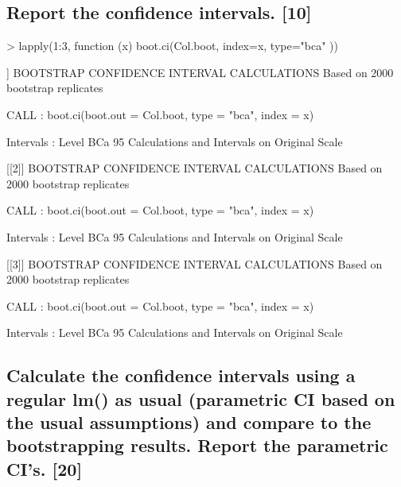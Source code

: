 \documentclass[letterpaper]{article}
\begin{document}
\subsection{Report the confidence intervals. [10]}

\begin{Schunk}
\begin{Sinput}
> lapply(1:3, function (x) {boot.ci(Col.boot, index=x, type="bca" )})
\end{Sinput}
\begin{Soutput}
[[1]]
BOOTSTRAP CONFIDENCE INTERVAL CALCULATIONS
Based on 2000 bootstrap replicates

CALL : 
boot.ci(boot.out = Col.boot, type = "bca", index = x)

Intervals : 
Level       BCa          
95%   (-0.5403, -0.1089 )  
Calculations and Intervals on Original Scale

[[2]]
BOOTSTRAP CONFIDENCE INTERVAL CALCULATIONS
Based on 2000 bootstrap replicates

CALL : 
boot.ci(boot.out = Col.boot, type = "bca", index = x)

Intervals : 
Level       BCa          
95%   (-2.7107,  1.8781 )  
Calculations and Intervals on Original Scale

[[3]]
BOOTSTRAP CONFIDENCE INTERVAL CALCULATIONS
Based on 2000 bootstrap replicates

CALL : 
boot.ci(boot.out = Col.boot, type = "bca", index = x)

Intervals : 
Level       BCa          
95%   (-1.6335,  3.1098 )  
Calculations and Intervals on Original Scale
\end{Soutput}
\end{Schunk}

\subsection{Calculate the confidence intervals using a regular lm() as usual (parametric CI based on the usual assumptions) and compare to the bootstrapping results. Report the parametric CI's. [20]}
\end{document}
